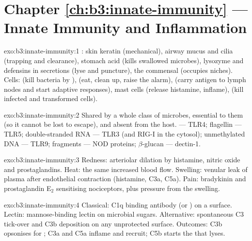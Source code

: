 \section*{Chapter \ref{ch:b3:innate-immunity} --- Innate Immunity and Inflammation}

\begin{solution}{exo:b3:innate-immunity:1}
: skin keratin (mechanical), airway mucus and cilia (trapping
and clearance), stomach acid (kills swallowed microbes), lysozyme and
defensins in secretions (lyse and puncture), the commensal 
(occupies niches). Cells:  (kill bacteria by ),
 (eat, clean up, raise the alarm),  (carry
antigen to lymph nodes and start adaptive responses), mast cells
(release histamine, inflame),  (kill infected and
transformed cells).
\end{solution}

\begin{solution}{exo:b3:innate-immunity:2}
Shared by a whole class of microbes, essential to them (so it cannot
be lost to escape), and absent from the host.  ---
TLR4; flagellin --- TLR5; double-stranded RNA --- TLR3 (and RIG-I in the
cytosol); unmethylated  DNA --- TLR9;  fragments --- NOD
proteins; $\beta$-glucan --- dectin-1.
\end{solution}

\begin{solution}{exo:b3:innate-immunity:3}
Redness: arteriolar dilation by histamine, nitric oxide and
prostaglandins. Heat: the same increased blood flow. Swelling: venular
leak of plasma after endothelial contraction (histamine, C3a, C5a).
Pain: bradykinin and prostaglandin E$_{2}$ sensitising nociceptors,
plus pressure from the swelling.
\end{solution}

\begin{solution}{exo:b3:innate-immunity:4}
Classical: C1q binding antibody (or ) on a surface.
Lectin: mannose-binding lectin on microbial sugars. Alternative:
spontaneous C3 tick-over and C3b deposition on any unprotected surface.
Outcomes: C3b opsonises for ; C3a and C5a inflame and
recruit; C5b starts the  that lyses.
\end{solution}

